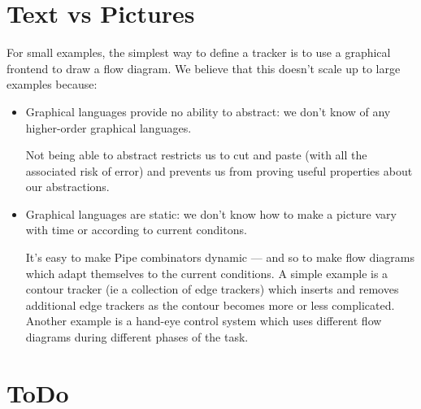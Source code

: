 \section{Text vs Pictures}

For small examples, the simplest way to define a tracker is to
use a graphical frontend to draw a flow diagram.  We believe that
this doesn't scale up to large examples because:

\begin{itemize}
\item
  Graphical languages provide no ability to abstract: we don't know
  of any higher-order graphical languages.

  Not being able to abstract restricts us to cut and paste (with all
  the associated risk of error) and prevents us from proving
  useful properties about our abstractions.

\item
  Graphical languages are static: we don't know how to make a 
  picture vary with time or according to current conditons.

  It's easy to make Pipe combinators dynamic --- and so to make flow
  diagrams which adapt themselves to the current conditions.  A simple
  example is a contour tracker (ie a collection of edge trackers)
  which inserts and removes additional edge trackers as the contour
  becomes more or less complicated.  Another example is a hand-eye
  control system which uses different flow diagrams during different
  phases of the task.

\end{itemize}


\section{ToDo}

